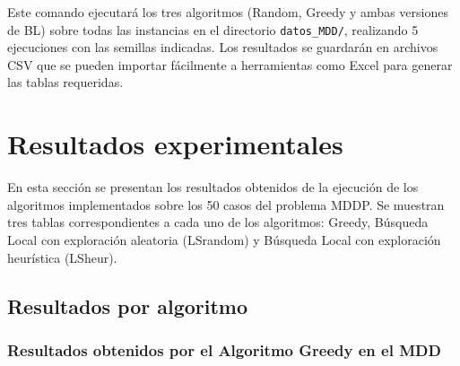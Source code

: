 \documentclass{article}
\begin{document}
Este comando ejecutará los tres algoritmos (Random, Greedy y ambas versiones de BL) sobre todas las instancias en el directorio \texttt{datos\_MDD/}, realizando 5 ejecuciones con las semillas indicadas. Los resultados se guardarán en archivos CSV que se pueden importar fácilmente a herramientas como Excel para generar las tablas requeridas.

\section{Resultados experimentales}

En esta sección se presentan los resultados obtenidos de la ejecución de los algoritmos implementados sobre los 50 casos del problema MDDP. Se muestran tres tablas correspondientes a cada uno de los algoritmos: Greedy, Búsqueda Local con exploración aleatoria (LSrandom) y Búsqueda Local con exploración heurística (LSheur).

\subsection{Resultados por algoritmo}

\newpage
\subsubsection{Resultados obtenidos por el Algoritmo Greedy en el MDD}
\end{document}

